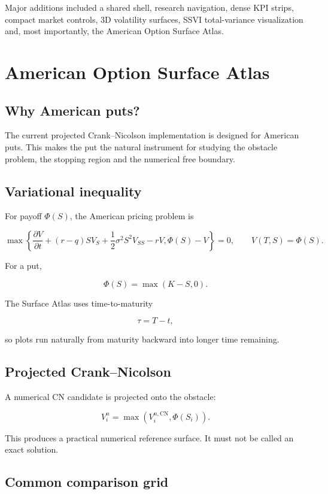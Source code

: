 \documentclass[11pt,a4paper]{article}
\begin{document}
Major additions included a shared shell, research navigation, dense KPI strips, compact market controls, 3D volatility surfaces, SSVI total-variance visualization and, most importantly, the American Option Surface Atlas.

\section{American Option Surface Atlas}

\subsection{Why American puts?}

The current projected Crank--Nicolson implementation is designed for American puts. This makes the put the natural instrument for studying the obstacle problem, the stopping region and the numerical free boundary.

\subsection{Variational inequality}

For payoff \(\Phi(S)\), the American pricing problem is

\[
\max\left\{
\frac{\partial V}{\partial t}
+(r-q)S V_S
+\frac12\sigma^2S^2V_{SS}
-rV,
\Phi(S)-V
\right\}=0,
\qquad V(T,S)=\Phi(S).
\]

For a put,

\[
\Phi(S)=\max(K-S,0).
\]

The Surface Atlas uses time-to-maturity

\[
\tau=T-t,
\]

so plots run naturally from maturity backward into longer time remaining.

\subsection{Projected Crank--Nicolson}

A numerical CN candidate is projected onto the obstacle:

\[
V_i^n=\max\left(V_i^{n,\mathrm{CN}},\Phi(S_i)\right).
\]

This produces a practical numerical reference surface. It must not be called an exact solution.

\subsection{Common comparison grid}
\end{document}

